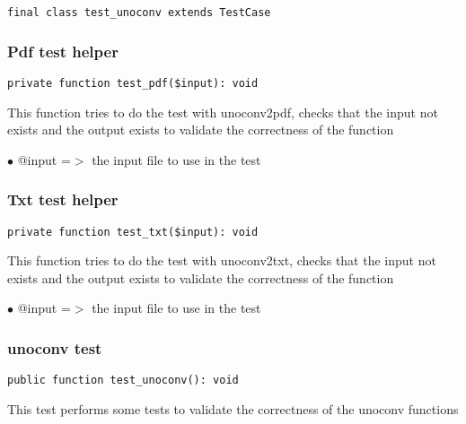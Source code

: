 \documentclass[a4paper]{article}
\begin{document}
\begin{lstlisting}
final class test_unoconv extends TestCase
\end{lstlisting}

\hypertarget{toc399}{}
\subsubsection{Pdf test helper}

\begin{lstlisting}
private function test_pdf($input): void
\end{lstlisting}

This function tries to do the test with unoconv2pdf, checks
that the input not exists and the output exists to validate
the correctness of the function

\begin{compactitem}
\item[\color{myblue}$\bullet$] @input =$>$ the input file to use in the test
\end{compactitem}

\hypertarget{toc400}{}
\subsubsection{Txt test helper}

\begin{lstlisting}
private function test_txt($input): void
\end{lstlisting}

This function tries to do the test with unoconv2txt, checks
that the input not exists and the output exists to validate
the correctness of the function

\begin{compactitem}
\item[\color{myblue}$\bullet$] @input =$>$ the input file to use in the test
\end{compactitem}

\hypertarget{toc401}{}
\subsubsection{unoconv test}

\begin{lstlisting}
public function test_unoconv(): void
\end{lstlisting}

This test performs some tests to validate the correctness
of the unoconv functions
\end{document}
